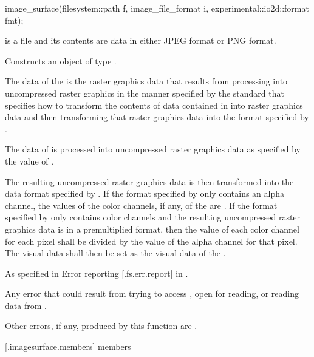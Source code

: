 \begin{itemdecl}
image_surface(filesystem::path f, image_file_format i,
  experimental::io2d::format fmt);
\end{itemdecl}
\begin{itemdescr}
\pnum
\requires
{} is a file and its contents are data in either JPEG format or PNG format.

\pnum
\effects
Constructs an object of type .

\pnum
The data of the \underlyingimagesurface is the raster graphics data that results from processing  into uncompressed raster graphics in the manner specified by the standard that specifies how to transform the contents of data contained in  into raster graphics data and then transforming that raster graphics data into the format specified by .

\pnum
The data of  is processed into uncompressed raster graphics data as specified by the value of .

\pnum
The resulting uncompressed raster graphics data is then transformed into the data format specified by . If the format specified by  only contains an alpha channel, the values of the color channels, if any, of the \underlyingimagesurface are \unspecnorm. If the format specified by  only contains color channels and the resulting uncompressed raster graphics data is in a premultiplied format, then the value of each color channel for each pixel shall be divided by the value of the alpha channel for that pixel. The visual data shall then be set as the visual data of the \underlyingimagesurface.

\pnum
\throws
As specified in Error reporting [\iotwod.fs.err.report] in \cppseventeen.

\pnum
\errors
Any error that could result from trying to access , open  for reading, or reading data from .

\pnum
Other errors, if any, produced by this function are .
\end{itemdescr}

 [\iotwod.imagesurface.members] { members}

